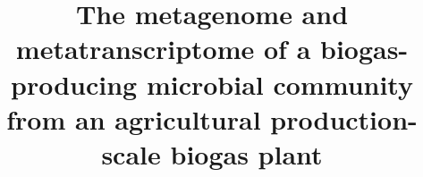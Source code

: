 \documentclass{bmcart}
\begin{document}
\begin{frontmatter}

\begin{fmbox}


\title{The metagenome and metatranscriptome of a biogas-producing microbial community from an agricultural production-scale biogas plant}


\author[
   addressref={cebitec,techfak},                   %
   email={abremges@cebitec.uni-bielefeld.de}   %
]{ }
\author[
   addressref={cebitec}
]{ }
\author[
   addressref={cebitec}
]{ }
\author[
   addressref={cebitec}
]{ }
\author[
   addressref={cebitec}
]{ }
\author[
   addressref={cebitec}
]{ }
\author[
   addressref={cebitec},
   noteref={n1}
]{ }
\author[
   addressref={cebitec,techfak},
   corref={cebitec},
   noteref={n1},
   email={asczyrba@cebitec.uni-bielefeld.de}
]{ }



\end{fmbox}
\end{frontmatter}
\end{document}
